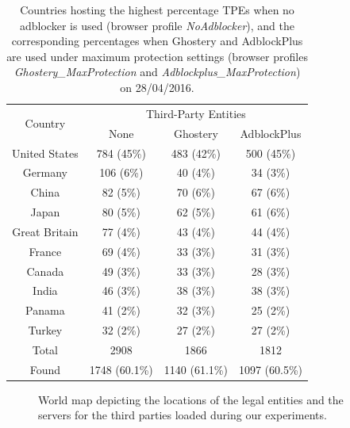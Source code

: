 \documentclass[compsoc, conference, letterpaper, 10pt, times]{IEEEtran}
\begin{document}
  \begin{table}
  \centering
  \begin{tabular}{|c|c|c|c|}
  \hline
  \multirow{2}{*}{Country} & \multicolumn{3}{|c|}{Third-Party Entities} \\
  \cline{2-4}
  & \scriptsize{None} & \scriptsize{Ghostery} & \scriptsize{AdblockPlus} \\
  \hline
  United States & 784 (45\%) & 483 (42\%) & 500 (45\%) \\
  Germany & 106 (6\%) & 40 (4\%) & 34 (3\%) \\
  China & 82 (5\%) & 70 (6\%) & 67 (6\%) \\
  Japan & 80 (5\%) & 62 (5\%) & 61 (6\%) \\
  Great Britain & 77 (4\%) & 43 (4\%) & 44 (4\%) \\
  France & 69 (4\%) & 33 (3\%) & 31 (3\%) \\
  Canada & 49 (3\%) & 33 (3\%) & 28 (3\%) \\
  India & 46 (3\%) & 38 (3\%) & 38 (3\%) \\
  Panama & 41 (2\%) & 32 (3\%) & 25 (2\%) \\
  Turkey & 32 (2\%) & 27 (2\%) & 27 (2\%) \\
  \hline
  Total & 2908 & 1866 & 1812 \\
  Found & 1748 (60.1\%) & 1140 (61.1\%) & 1097 (60.5\%) \\
  \hline
  \end{tabular}
  \caption{Countries hosting the highest percentage TPEs when no adblocker is used (browser profile \textit{NoAdblocker}), and the corresponding percentages when Ghostery and AdblockPlus are used under maximum protection settings (browser profiles \textit{Ghostery\_MaxProtection} and \textit{Adblockplus\_MaxProtection}) on 28/04/2016.}
  \label{table:top_10_third_party_countries}
  \end{table}
  


\begin{figure}[!t]
 \centering
   \hfill
 \caption{World map depicting the locations of the legal entities and the servers for the third parties loaded during our experiments.}
\end{figure}
\end{document}
